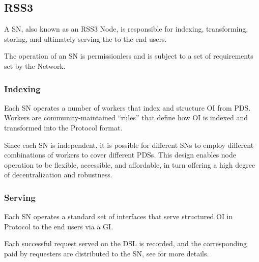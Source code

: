 \subsection{RSS3 }
\label{subsec:SN}

A \gls{SN}, also known as an RSS3 Node, is responsible for indexing, transforming, storing, and ultimately serving the  to the end users.

The operation of an \gls{SN} is permissionless and is subject to a set of requirements set by the Network.

\subsubsection{Indexing}
Each \gls{SN} operates a number of workers that index and structure \gls{OI} from \gls{PDS}.
Workers are community-maintained ``rules'' that define how \gls{OI} is indexed and transformed into the \gls{Protocol} format.

Since each \gls{SN} is independent, it is possible for different \glspl{SN} to employ different combinations of workers to cover different \glspl{PDS}.
This design enables node operation to be flexible, accessible, and affordable, in turn offering a high degree of decentralization and robustness.

\subsubsection{Serving}
Each \gls{SN} operates a standard set of interfaces that serve structured \gls{OI} in \gls{Protocol} to the end users via a \gls{GI}.

Each successful request served on the \gls{DSL} is recorded, and the corresponding  paid by requesters are distributed to the \gls{SN}, see  for more details.

